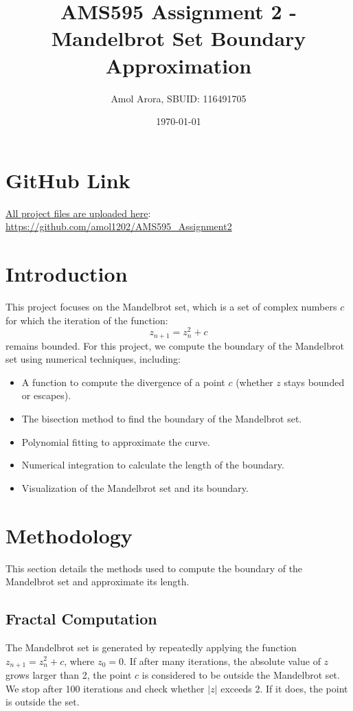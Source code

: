 \documentclass{article}
\title{\textbf{AMS595 Assignment 2} - Mandelbrot Set Boundary Approximation}
\author{Amol Arora, SBUID: 116491705}
\date{\today}
\begin{document}
\maketitle

\section{GitHub Link}
\underline{All project files are uploaded here}:
\url{https://github.com/amol1202/AMS595_Assignment2}

\section{Introduction}
This project focuses on the Mandelbrot set, which is a set of complex numbers \( c \) for which the iteration of the function:
\[
z_{n+1} = z_n^2 + c
\]
remains bounded. For this project, we compute the boundary of the Mandelbrot set using numerical techniques, including:
\begin{itemize}
    \item A function to compute the divergence of a point \( c \) (whether \( z \) stays bounded or escapes).
    \item The bisection method to find the boundary of the Mandelbrot set.
    \item Polynomial fitting to approximate the curve.
    \item Numerical integration to calculate the length of the boundary.
    \item Visualization of the Mandelbrot set and its boundary.
\end{itemize}

\section{Methodology}
This section details the methods used to compute the boundary of the Mandelbrot set and approximate its length.

\subsection{Fractal Computation}
The Mandelbrot set is generated by repeatedly applying the function \( z_{n+1} = z_n^2 + c \), where \( z_0 = 0 \). If after many iterations, the absolute value of \( z \) grows larger than 2, the point \( c \) is considered to be outside the Mandelbrot set. We stop after 100 iterations and check whether \( |z| \) exceeds 2. If it does, the point is outside the set.
\end{document}
